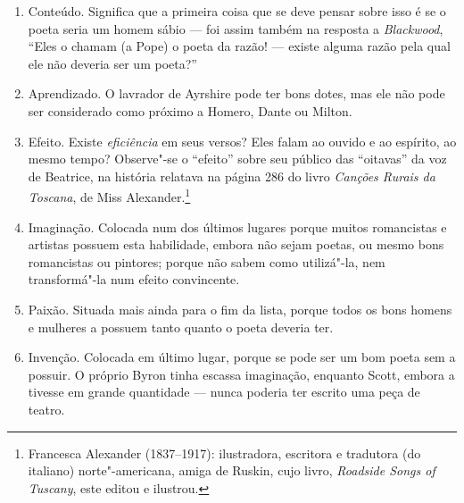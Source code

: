 \begin{enumerate}[label=(\scshape\alph*)]
\item Conteúdo. Significa que a primeira coisa que se deve pensar sobre
isso é se o poeta seria um homem sábio --- foi assim também na resposta a
\textit{Blackwood}, ``Eles o chamam (a Pope) o poeta da razão! --- existe
alguma razão pela qual ele não deveria ser um poeta?''

\item Aprendizado. O lavrador de Ayrshire pode ter bons dotes, mas ele
não pode ser considerado como próximo a Homero, Dante ou Milton.

\item Efeito. Existe \textit{eficiência} em seus versos? Eles falam ao
ouvido e ao espírito, ao mesmo tempo? Observe"-se o ``efeito'' sobre seu
público das ``oitavas'' da voz de Beatrice, na história relatava na
página 286 do livro \textit{Canções Rurais da Toscana}, de Miss
Alexander.\footnote{Francesca Alexander (1837--1917): ilustradora,
  escritora e tradutora (do italiano) norte"-americana, amiga de Ruskin,
  cujo livro, \textit{Roadside Songs of Tuscany}, este editou e ilustrou.}

\item Imaginação. Colocada num dos últimos lugares porque muitos
romancistas e artistas possuem esta habilidade, embora não sejam poetas,
ou mesmo bons romancistas ou pintores; porque não sabem como utilizá"-la,
nem transformá"-la num efeito convincente.

\item Paixão. Situada mais ainda para o fim da lista, porque todos os
bons homens e mulheres a possuem tanto quanto o poeta deveria ter.

\item Invenção. Colocada em último lugar, porque se pode ser um bom poeta
sem a possuir. O próprio Byron tinha escassa imaginação, enquanto Scott,
embora a tivesse em grande quantidade --- nunca poderia ter escrito uma
peça de teatro.
\end{enumerate}

